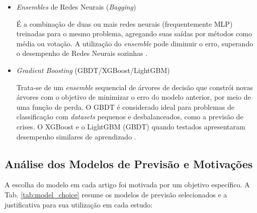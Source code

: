 \begin{itemize}
    \item \textit{Ensembles} de Redes Neurais (\textit{Bagging})
    
    É a combinação de duas ou mais redes neurais (frequentemente MLP) treinadas para o mesmo problema, agregando suas saídas por métodos como média ou votação. A utilização do \textit{ensemble} pode diminuir o erro, superando o desempenho de Redes Neurais sozinhas \cite{Giacomel2016MetodoAlgoritmico}.
    
    \item \textit{Gradient Boosting} (GBDT/XGBoost/LightGBM)
    
    
    Trata-se de um \textit{ensemble} sequencial de árvores de decisão que constrói novas árvores com o objetivo de minimizar o erro do modelo anterior, por meio de uma função de perda. O GBDT é considerado ideal para problemas de classificação com \textit{datasets} pequenos e desbalanceados, como a previsão de crises. O XGBoost e o LightGBM (GBDT) quando testados apresentaram desempenho similares de aprendizado \cite{Benhamou2021XAIPlanning}.
\end{itemize}


\subsection{Análise dos Modelos de Previsão e Motivações}

A escolha do modelo em cada artigo foi motivada por um objetivo específico. A Tab. \ref{tab:model_choice} resume os modelos de previsão selecionados e a justificativa para sua utilização em cada estudo:

